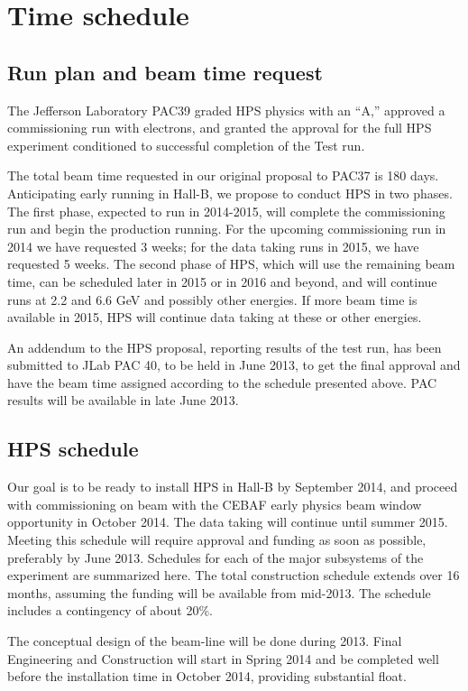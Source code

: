 \documentclass[11pt]{report}
\begin{document}
\section{Time schedule}
\subsection{Run plan and beam time request}
The Jefferson Laboratory PAC39 graded HPS physics with an ``A,''   approved a commissioning run with electrons, and granted the approval 
for the full HPS experiment conditioned to successful completion of the Test run.

The total beam time requested in our original proposal to PAC37 is 180 days.
Anticipating early running in Hall-B, we propose to conduct HPS in two phases. The first phase, expected to run 
in 2014-2015, will complete the commissioning run and begin the production running. For the upcoming commissioning run in 2014 
we have requested 3 weeks; for the data taking runs in
2015, we have requested 5 weeks. The second phase of HPS, which will use the remaining beam time, can be scheduled later in 2015 
or in 2016 and beyond, and will continue runs at 2.2 and 6.6 GeV and possibly other energies.
If more beam time is available in 2015, HPS will continue data taking at these or other energies.

An addendum to the HPS proposal, reporting results of the test run,  has been submitted to JLab PAC 40, to be held in June 2013, to get the final approval and have the beam time assigned according  to the schedule
presented above. PAC results will be available in late June 2013. 


\subsection{HPS schedule}
Our goal is to be ready to install HPS in Hall-B by September 2014, and proceed with commissioning on beam with the 
CEBAF early physics beam window opportunity in October 2014. The data taking will continue until summer 2015. Meeting this schedule
will require approval and funding as soon as possible, preferably by June 2013. Schedules for each of the major subsystems of the 
experiment are  summarized here. The total construction schedule extends over 16 months, assuming the funding will be
available from mid-2013. The schedule  includes a contingency of about 20\%. 

The conceptual design of the beam-line will be done during 2013. 
Final Engineering and Construction will start in Spring 2014 and be completed well before the installation time in October 2014, 
providing substantial float. 
\end{document}
